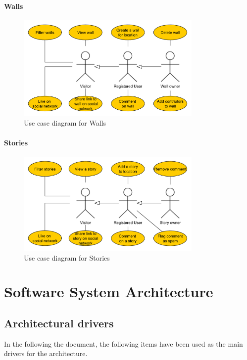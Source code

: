 \documentclass[11pt]{book}
\begin{document}
\subsubsection{Walls}
\begin{figure}[H]
      \centering
      \includegraphics[width=0.8\textwidth]{Figures/Requirements/wall.pdf}
      \caption{Use case diagram for Walls}
      \label{fig:req_usecase_walls}
\end{figure}

\subsubsection{Stories}
\begin{figure}[H]
      \centering
      \includegraphics[width=0.8\textwidth]{Figures/Requirements/story.pdf}
      \caption{Use case diagram for Stories}
      \label{fig:req_usecase_stories}
\end{figure}


\chapter{Software System Architecture}\label{chap:architecture}

\section{Architectural drivers} \label{sec:architecture_drivers}
In the following the document, the following items have been used as the main drivers for the architecture.
\end{document}
